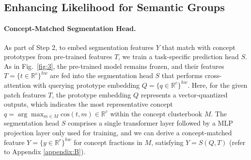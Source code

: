 \documentclass{article} \usepackage{iclr2024_conference,times}
\begin{document}
\subsection{Enhancing Likelihood for Semantic Groups}
\label{sec:3.3}

\paragraph{Concept-Matched Segmentation Head.} As part of Step 2, to embed segmentation features $Y$ that match with concept prototypes from pre-trained features $T$, we train a task-specific prediction head $S$. As in Fig.~\ref{fig:3}, the pre-trained model remains frozen, and their features $T=\{t\in\mathbb{R}^{c}\}^{hw}$ are fed into the segmentation head $S$ that performs cross-attention with querying prototype embedding $Q=\{q\in\mathbb{R}^{c}\}^{hw}$. Here, for the given patch features $T$, the prototype embedding $Q$ represents a vector-quantized outputs, which indicates the most representative concept $q = \arg\max_{m\in M}\text{cos}(t, m)\in\mathbb{R}^c$ within the concept clusterbook $M$. The segmentation head $S$ comprises a single transformer layer followed by a MLP projection layer only used for training, and we can derive a concept-matched feature $Y=\{y\in\mathbb{R}^{r}\}^{hw}$ for concept fractions in $M$, satisfying $Y=S(Q, T)$ (refer to Appendix \ref{appendix:B}).
\end{document}
